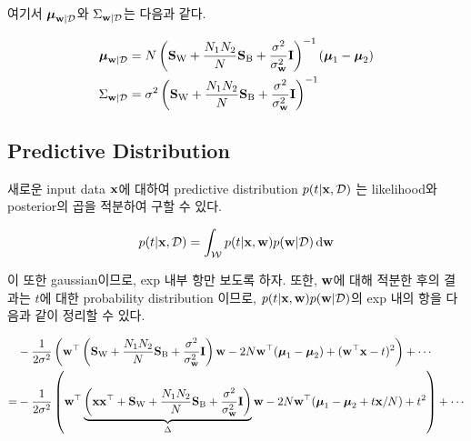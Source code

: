 \documentclass{article} %
\begin{document}
여기서 $\boldsymbol{\mu}_{{\bf w} | {\cal D}}$와 $\Sigma_{{\bf w} | {\cal D}}$는 다음과 같다.

\begin{equation}
\begin{aligned}
	\boldsymbol{\mu}_{{\bf w} | {\cal D}} &= N \left( {\bf S}_{\rm W} + \frac{N_1 N_2}{N} {\bf S}_{\rm B} + \frac{\sigma^2}{\sigma_{\bf w}^2}{\bf I} \right)^{-1} (\boldsymbol{\mu}_1 - \boldsymbol{\mu}_2)
	\\
	\Sigma_{{\bf w} | {\cal D}} &= \sigma^2 \left( {\bf S}_{\rm W} + \frac{N_1 N_2}{N} {\bf S}_{\rm B} + \frac{\sigma^2}{\sigma_{\bf w}^2}{\bf I} \right)^{-1}
\end{aligned}
\end{equation}

\subsection{Predictive Distribution}
새로운 input data ${\bf x}$에 대하여 predictive distribution $p(t | {\bf x}, {\cal D})$ 는 likelihood와 posterior의 곱을 적분하여 구할 수 있다.

\begin{equation}
	p(t | {\bf x}, {\cal D}) = \int _{\cal W} p(t | {\bf x}, {\bf w}) p({\bf w} | {\cal D}) \dd{{\bf w}}
\end{equation}

이 또한 gaussian이므로, exp 내부 항만 보도록 하자. 또한, ${\bf w}$에 대해 적분한 후의 결과는 $t$에 대한 probability distribution 이므로, $p(t | {\bf x}, {\bf w}) p({\bf w} | {\cal D})$의 exp 내의 항을 다음과 같이 정리할 수 있다.

\begin{equation}
\begin{aligned}
	&-\frac{1}{2 \sigma^2} \left(
		{\bf w}^\top \left( {\bf S}_{\rm W} + \frac{N_1 N_2}{N} {\bf S}_{\rm B} + \frac{\sigma^2}{\sigma_{\bf w}^2}{\bf I} \right)
		{\bf w} - 2N{\bf w}^\top (\boldsymbol{\mu}_1 - \boldsymbol{\mu}_2) + ({\bf w}^\top {\bf x} - t)^2
	 \right) + \cdots 
	 \\
	 =& -\frac{1}{2 \sigma^2} \left(
	 {\bf w}^\top \underbrace{\left( {\bf x}{\bf x}^\top +  {\bf S}_{\rm W} + \frac{N_1 N_2}{N} {\bf S}_{\rm B} + \frac{\sigma^2}{\sigma_{\bf w}^2}{\bf I} \right)}_{\Delta}
	 {\bf w} - 2N{\bf w}^\top (\boldsymbol{\mu}_1 - \boldsymbol{\mu}_2 + t{\bf x}/N) + t^2
	 \right) + \cdots 
\end{aligned}
\end{equation}
\end{document}
